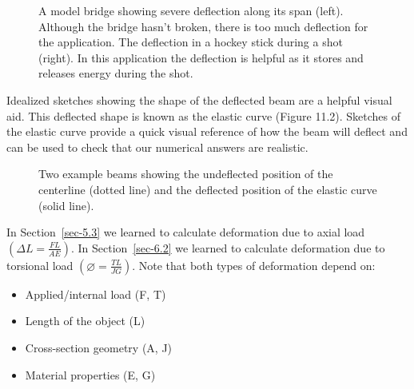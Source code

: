 \documentclass[
  letterpaper,
  DIV=11,
  numbers=noendperiod]{scrreprt}
\theoremstyle{definition}
\theoremstyle{remark}
\begin{document}
\begin{figure}


\caption{\label{fig-11.1}A model bridge showing severe deflection along
its span (left). Although the bridge hasn't broken, there is too much
deflection for the application. The deflection in a hockey stick during
a shot (right). In this application the deflection is helpful as it
stores and releases energy during the shot.}

\end{figure}%

Idealized sketches showing the shape of the deflected beam are a helpful
visual aid. This deflected shape is known as the elastic curve (Figure
11.2). Sketches of the elastic curve provide a quick visual reference of
how the beam will deflect and can be used to check that our numerical
answers are realistic.

\begin{figure}


\caption{\label{fig-11.2}Two example beams showing the undeflected
position of the centerline (dotted line) and the deflected position of
the elastic curve (solid line).}

\end{figure}%

In Section~\ref{sec-5.3} we learned to calculate deformation due to
axial load \(\left(\Delta L=\frac{F L}{A E}\right)\). In
Section~\ref{sec-6.2} we learned to calculate deformation due to
torsional load \(\left(\varnothing=\frac{T L}{J G}\right)\). Note that
both types of deformation depend on:

\begin{itemize}
\item
  Applied/internal load (F, T)
\item
  Length of the object (L)
\item
  Cross-section geometry (A, J)
\item
  Material properties (E, G)
\end{itemize}
\end{document}
